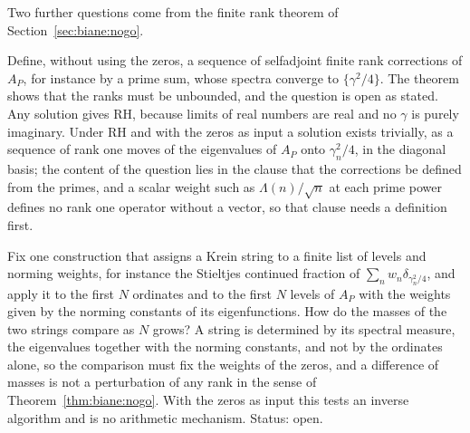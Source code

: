 Two further questions come from the finite rank theorem of Section~\ref{sec:biane:nogo}.

\begin{question}\label{q:biane:infrank}
Define, without using the zeros, a sequence of selfadjoint finite rank corrections of $A_P$, for instance by a prime sum, whose spectra converge to $\{\gamma^2/4\}$. The theorem shows that the ranks must be unbounded, and the question is open as stated. Any solution gives RH, because limits of real numbers are real and no $\gamma$ is purely imaginary. Under RH and with the zeros as input a solution exists trivially, as a sequence of rank one moves of the eigenvalues of $A_P$ onto $\gamma_n^2/4$, in the diagonal basis; the content of the question lies in the clause that the corrections be defined from the primes, and a scalar weight such as $\Lambda(n)/\sqrt n$ at each prime power defines no rank one operator without a vector, so that clause needs a definition first.
\end{question}

\begin{question}\label{q:biane:string}
Fix one construction that assigns a Krein string to a finite list of levels and norming weights, for instance the Stieltjes continued fraction of $\sum_nw_n\delta_{\gamma_n^2/4}$, and apply it to the first $N$ ordinates and to the first $N$ levels of $A_P$ with the weights given by the norming constants of its eigenfunctions. How do the masses of the two strings compare as $N$ grows? A string is determined by its spectral measure, the eigenvalues together with the norming constants, and not by the ordinates alone, so the comparison must fix the weights of the zeros, and a difference of masses is not a perturbation of any rank in the sense of Theorem~\ref{thm:biane:nogo}. With the zeros as input this tests an inverse algorithm and is no arithmetic mechanism. Status: open.
\end{question}
